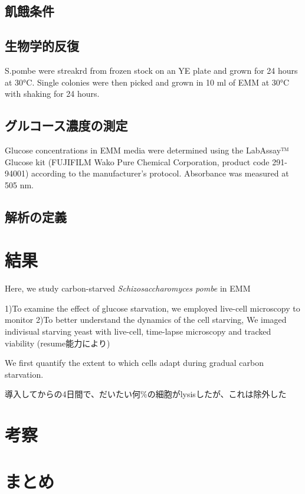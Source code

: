 \subsection{飢餓条件}

\subsection{生物学的反復}
S.pombe were streakrd from frozen stock on an YE plate and grown for 24 hours at 30°C. Single colonies were then picked and grown in 10 ml of EMM at 30°C with shaking for 24 hours.


\subsection{グルコース濃度の測定}
Glucose concentrations in EMM media were determined using the LabAssay™ Glucose kit (FUJIFILM Wako Pure Chemical Corporation, product code 291-94001) according to the manufacturer's protocol. Absorbance was measured at 505 nm.

\subsection{解析の定義}

\section{結果}
Here, we study carbon-starved \textit{Schizosaccharomyces pombe} in EMM

1)To examine the effect of glucose starvation, we employed live-cell microscopy to monitor 
2)To better understand the dynamics of the cell starving, We imaged indivisual starving yeast with live-cell, time-lapse microscopy and tracked viability (resume能力により)

We first quantify the extent to which cells adapt during gradual carbon starvation.

導入してからの4日間で、だいたい何\%の細胞がlysisしたが、これは除外した


\section{考察}

\section{まとめ}
